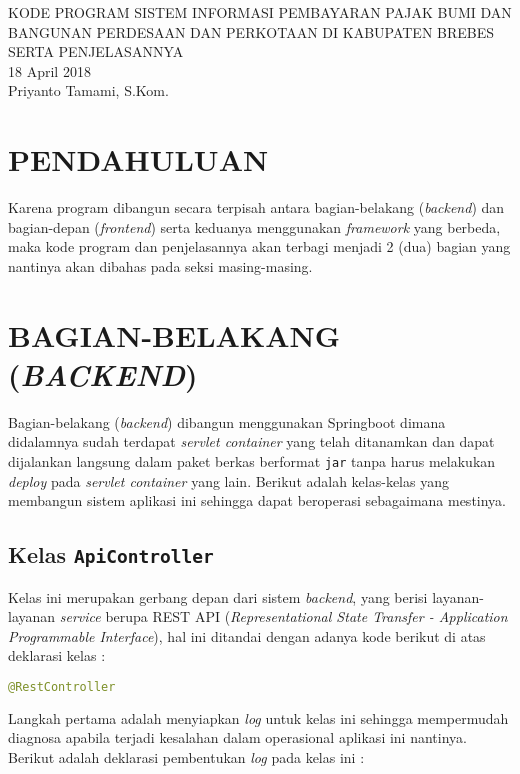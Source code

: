 \documentclass[pdftex,12pt, oneside]{article}
\begin{document}
%
\begin{center}
{\large KODE PROGRAM SISTEM INFORMASI PEMBAYARAN PAJAK BUMI DAN BANGUNAN PERDESAAN DAN PERKOTAAN DI KABUPATEN BREBES SERTA PENJELASANNYA}
\\[1cm]
18 April 2018\\
Priyanto Tamami, S.Kom.
\end{center}

\section{PENDAHULUAN}

Karena program dibangun secara terpisah antara bagian-belakang (\textit{backend}) dan bagian-depan (\textit{frontend}) serta keduanya menggunakan \textit{framework} yang berbeda, maka kode program dan penjelasannya akan terbagi menjadi 2 (dua) bagian yang nantinya akan dibahas pada seksi masing-masing.

\section{BAGIAN-BELAKANG (\textit{BACKEND})}

Bagian-belakang (\textit{backend}) dibangun menggunakan Springboot dimana didalamnya sudah terdapat \textit{servlet container} yang telah ditanamkan dan dapat dijalankan langsung dalam paket berkas berformat \texttt{jar} tanpa harus melakukan \textit{deploy} pada \textit{servlet container} yang lain. Berikut adalah kelas-kelas yang membangun sistem aplikasi ini sehingga dapat beroperasi sebagaimana mestinya.

\subsection{Kelas \texttt{ApiController}}

Kelas ini merupakan gerbang depan dari sistem \textit{backend}, yang berisi layanan-layanan \textit{service} berupa REST API (\textit{Representational State Transfer - Application Programmable Interface}), hal ini ditandai dengan adanya kode berikut di atas deklarasi kelas :

\begin{lstlisting}[language=java]
@RestController
\end{lstlisting}

Langkah pertama adalah menyiapkan \textit{log} untuk kelas ini sehingga mempermudah diagnosa apabila terjadi kesalahan dalam operasional aplikasi ini nantinya. Berikut adalah deklarasi pembentukan \textit{log} pada kelas ini :
\end{document}
